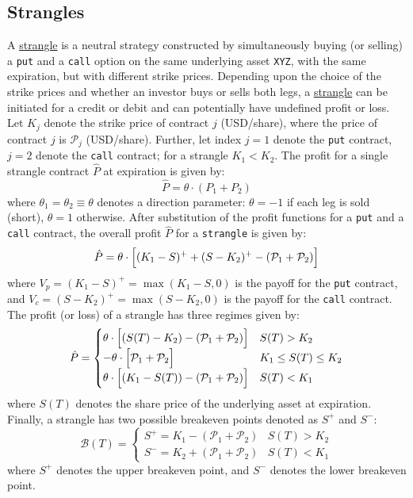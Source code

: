\documentclass[11pt]{article}
\theoremstyle{definition}
\begin{document}
\subsection*{Strangles}
A \href{https://www.investopedia.com/terms/s/strangle.asp}{strangle} is a neutral strategy constructed by simultaneously buying (or selling)
a \texttt{put} and a \texttt{call} option on the same underlying asset \texttt{XYZ}, with the same expiration, but with different strike prices.
Depending upon the choice of the strike prices and whether an investor buys or sells both legs, a \href{https://www.investopedia.com/terms/s/strangle.asp}{strangle} 
can be initiated for a credit or debit and can potentially have undefined profit or loss. Let $K_{j}$ denote the strike price of contract $j$ (USD/share), 
where the price of contract $j$ is $\mathcal{P}_{j}$ (USD/share). Further, let index $j=1$ denote the \texttt{put} contract, $j=2$ denote the \texttt{call} contract; 
for a strangle $K_{1}<K_{2}$. The profit for a single strangle contract $\hat{P}$ at expiration is given by:
\begin{equation}
\hat{P} = \theta\cdot\left(P_{1}+P_{2}\right)
\end{equation}
where $\theta_{1} = \theta_{2}\equiv\theta$ denotes a direction parameter: $\theta=-1$ if each leg is sold (short), $\theta=1$ otherwise. 
After substitution of the profit functions for a \texttt{put} and a \texttt{call} contract, the overall profit $\hat{P}$ for a \texttt{strangle} 
is given by:
\begin{equation}
\hat{P} = \theta\cdot\Bigl[(K_{1}-S)^{+}+(S-K_{2})^{+}-(\mathcal{P}_{1}+\mathcal{P}_{2})\Bigr]
\end{equation}
where $V_{p} = (K_{1}-S)^{+}=\max(K_{1}-S,0)$ is the payoff for the \texttt{put} contract, 
and $V_{c} = (S-K_{2})^{+} = \max(S-K_{2},0)$ is the payoff for the \texttt{call} contract. 
The profit (or loss) of a strangle has three regimes given by:
\begin{equation}
\hat{P} = \begin{cases}
  \theta\cdot\Bigl[(S(T)-K_{2})-\left(\mathcal{P}_{1}+\mathcal{P}_{2}\right)\Bigr]  & S(T)>K_{2} \\
  -\theta\cdot\Bigl[\mathcal{P}_{1}+\mathcal{P}_{2}\Bigr] & K_{1}\leq{S(T)}\leq{K_{2}} \\
  \theta\cdot\Bigl[(K_{1}-S(T))-\left(\mathcal{P}_{1}+\mathcal{P}_{2}\right)\Bigr] & S(T)<{K_{1}}
\end{cases}
\end{equation}
where $S(T)$ denotes the share price of the underlying asset at expiration. 
Finally, a strangle has two possible breakeven points denoted as $S^{+}$ and $S^{-}$:
\begin{equation}
	\mathcal{B}(T) = \begin{cases}
		S^{+} = K_{1} - \left(\mathcal{P}_{1}+\mathcal{P}_{2}\right) & S(T) > K_{2} \\
		S^{-} = K_{2} + \left(\mathcal{P}_{1}+\mathcal{P}_{2}\right) & S(T) < K_{1}
	\end{cases}
\end{equation}
where $S^{+}$ denotes the upper breakeven point, and $S^{-}$ denotes the lower breakeven point.
\end{document}
